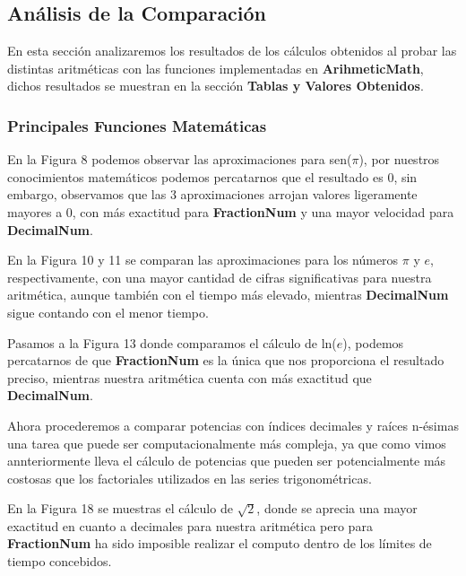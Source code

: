 \documentclass[a4paper,10pt,twocolumn]{article}
\begin{document}
\subsection{Análisis de la Comparación}\label{sub:comp}

	En esta sección analizaremos los resultados de los cálculos obtenidos al probar las distintas aritméticas con las funciones implementadas en \textbf{ArihmeticMath}, dichos resultados se muestran en la sección \textbf{Tablas y Valores Obtenidos}.
	
\subsubsection{Principales Funciones Matemáticas}\label{sub:math_func}

	
	En la Figura 8 podemos observar las aproximaciones para sen($\pi$), por nuestros conocimientos matemáticos podemos percatarnos que el resultado es 0, sin embargo, observamos 
que las 3 aproximaciones arrojan valores ligeramente mayores a 0, con más exactitud para \textbf{FractionNum} y una mayor velocidad para \textbf{DecimalNum}.

	En la Figura 10 y 11 se comparan las aproximaciones para los números $\pi$ y $e$, respectivamente, con una mayor cantidad de cifras significativas para nuestra aritmética, aunque también con el tiempo más elevado, mientras \textbf{DecimalNum} sigue contando con el menor tiempo. 
	
	Pasamos a la Figura 13 donde comparamos el cálculo de ln($e$), podemos percatarnos de que \textbf{FractionNum} es la única que nos proporciona el resultado preciso, mientras nuestra aritmética cuenta con más exactitud que \textbf{DecimalNum}.
	
	Ahora procederemos a comparar potencias con índices decimales y raíces n-ésimas una tarea que puede ser computacionalmente más compleja, ya que como vimos annteriormente lleva el cálculo de potencias que pueden ser potencialmente más costosas que los factoriales utilizados en las series trigonométricas.
	
	En la Figura 18 se muestras el cálculo de $\sqrt{2}$, donde se aprecia una mayor exactitud en cuanto a decimales para nuestra aritmética pero para \textbf{FractionNum} ha sido imposible realizar el computo dentro de los límites de tiempo concebidos.
	
\end{document}
